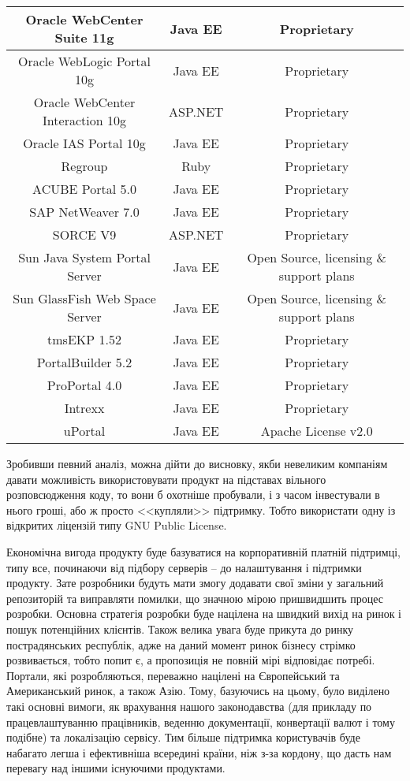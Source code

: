 {\begin{longtable}{|c|c|c|}
 Oracle WebCenter Suite 11g & Java EE & Proprietary \\ \hline
 Oracle WebLogic Portal 10g & Java EE & Proprietary \\ \hline
 Oracle WebCenter Interaction 10g & ASP.NET & Proprietary \\ \hline
 Oracle IAS Portal 10g & Java EE & Proprietary \\ \hline
 Regroup & Ruby & Proprietary \\ \hline
 ACUBE Portal 5.0 & Java EE & Proprietary \\ \hline
 SAP NetWeaver 7.0 & Java EE & Proprietary \\ \hline
 SORCE V9 & ASP.NET & Proprietary \\ \hline
 Sun Java System Portal Server & Java EE & Open Source, licensing \& support plans \\ \hline
 Sun GlassFish Web Space Server  & Java EE & Open Source, licensing \& support plans \\ \hline
 tmsEKP 1.52 & Java EE & Proprietary \\ \hline
 PortalBuilder 5.2 & Java EE & Proprietary \\ \hline
 ProPortal 4.0 & Java EE & Proprietary \\ \hline
 Intrexx & Java EE & Proprietary \\ \hline
 uPortal & Java EE & Apache License v2.0 \\ \hline

\end{longtable}
}


\par Зробивши певний аналіз, можна дійти до висновку, якби невеликим компаніям давати можливість використовувати продукт на підставах вільного розповсюдження коду, то вони б охотніше пробували, і з часом інвестували в нього гроші, або ж просто <<купляли>> підтримку.
Тобто використати одну із відкритих ліцензій типу GNU Public License.
\par Економічна вигода продукту буде базуватися на корпоративній платній підтримці, типу все, починаючи від підбору серверів -- до налаштування і підтримки продукту.
Зате розробники будуть мати змогу додавати свої зміни у загальний репозиторій та виправляти помилки, що значною мірою пришвидшить процес розробки.
Основна стратегія розробки буде націлена на швидкий вихід на ринок і пошук потенційних клієнтів.
Також велика увага буде прикута до ринку пострадянських республік, адже на даний момент ринок бізнесу стрімко розвивається, тобто попит є, а пропозиція не повній мірі відповідає потребі.
Портали, які розробляються, переважно націлені на Європейський та Американський ринок, а також Азію.
Тому, базуючись на цьому, було виділено такі основні вимоги, як врахування нашого законодавства (для прикладу по працевлаштуванню працівників, веденню документації, конвертації валют і тому подібне) та локалізацію сервісу.
Тим більше підтримка користувачів буде набагато легша і ефективніша всередині країни, ніж з-за кордону, що дасть нам перевагу над іншими існуючими продуктами.

